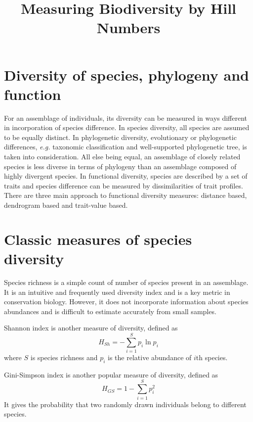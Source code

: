 \documentclass[11pt]{article}
\title{Measuring Biodiversity by Hill Numbers}
\date{}
\begin{document}
  \maketitle

  \linenumbers

\section{Diversity of species, phylogeny and function}
For an assemblage of individuals, its diversity can be measured in ways different in incorporation of species difference. 
In species diversity, all species are assumed to be equally distinct. 
In phylogenetic diversity, evolutionary or phylogenetic differences, \textit{e.g.} taxonomic classification and well-supported phylogenetic tree, is taken into consideration. 
All else being equal, an assemblage of closely related species is less diverse in terms of phylogeny than an assemblage composed of highly divergent species. 
In functional diversity, species are described by a set of traits and species difference can be measured by dissimilarities of trait profiles. 
There are three main approach to functional diversity measures: distance based, dendrogram based and trait-value based.

\section{Classic measures of species diversity}
\label{SpeciesRichness}
Species richness is a simple count of number of species present in an assemblage. 
It is an intuitive and frequently used diversity index and is a key metric in conservation biology. 
However, it does not incorporate information about species abundances and is difficult to estimate accurately from small samples. 

\newline

Shannon index is another measure of diversity, defined as 
\begin{equation}
    H_{Sh} = -\sum\limits_{i=1}^{S}p_i \ln p_i
    \label{ShannonIndex}
\end{equation}
where $S$ is species richness and $p_i$ is the relative abundance of $i$th species.

\newline

Gini-Simpson index is another popular measure of diversity, defined as 
\begin{equation}
    H_{GS}=1-\sum\limits_{i=1}^{S}p_i^2
    \label{GiniSimpsonIndex}
\end{equation}
It gives the probability that two randomly drawn individuals belong to different species.
\end{document}
